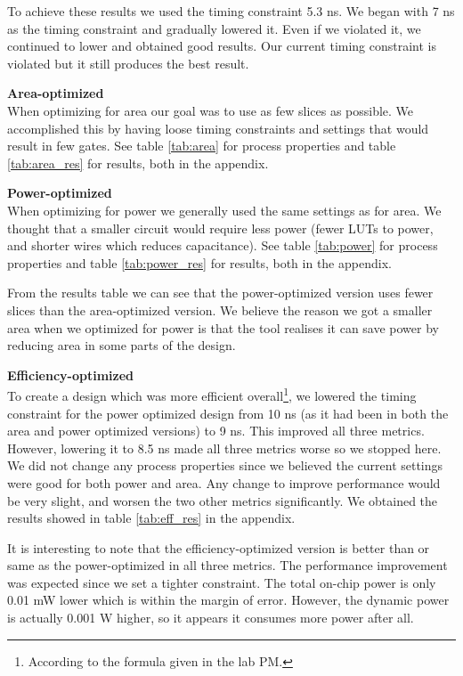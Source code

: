 \documentclass[a4paper,11pt]{article}
\begin{document}
To achieve these results we used the timing constraint 5.3 ns. We began with 7 ns as the timing constraint and gradually lowered it. Even if we violated it, we continued to lower and obtained good results. Our current timing constraint is violated but it still produces the best result.

\textbf{Area-optimized}\\
When optimizing for area our goal was to use as few slices as possible. We accomplished this by having loose timing constraints and settings that would result in few gates. See table \ref{tab:area} for process properties and table \ref{tab:area_res} for results, both in the appendix.

\textbf{Power-optimized}\\
When optimizing for power we generally used the same settings as for area. We thought that a smaller circuit would require less power (fewer LUTs to power, and shorter wires which reduces capacitance). See table \ref{tab:power} for process properties and table \ref{tab:power_res} for results, both in the appendix.

From the results table we can see that the power-optimized version uses fewer slices than the area-optimized version. We believe the reason we got a smaller area when we optimized for power is that the tool realises it can save power by reducing area in some parts of the design. 

\textbf{Efficiency-optimized}\\
To create a design which was more efficient overall\footnote{According to the formula given in the lab PM.}, we lowered the timing constraint for the power optimized design from 10 ns (as it had been in both the area and power optimized versions) to 9 ns. This improved all three metrics. However, lowering it to 8.5 ns made all three metrics worse so we stopped here. We did not change any process properties since we believed the current settings were good for both power and area. Any change to improve performance would be very slight, and worsen the two other metrics significantly. We obtained the results showed in table \ref{tab:eff_res} in the appendix.

It is interesting to note that the efficiency-optimized version is better than or same as the power-optimized in all three metrics. The performance improvement was expected since we set a tighter constraint. The total on-chip power is only 0.01 mW lower which is within the margin of error. However, the dynamic power is actually 0.001 W higher, so it appears it consumes more power after all.
\end{document}
